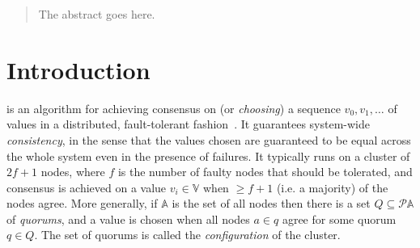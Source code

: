\documentclass[journal]{IEEEtran}
\begin{document}







\maketitle

\begin{abstract}
The abstract goes here. %
\end{abstract}







%
\IEEEpeerreviewmaketitle

\section{Introduction}

 is an algorithm for achieving consensus on (or
\textit{choosing}) a sequence $v_0, v_1, \ldots$ of values in a distributed,
fault-tolerant fashion~\cite{part-time-parliament}. It guarantees system-wide
\textit{consistency}, in the sense that the values chosen are guaranteed to be
equal across the whole system even in the presence of failures. It typically
runs on a cluster of $2f+1$ nodes, where $f$ is the number of faulty nodes that
should be tolerated, and consensus is achieved on a value $v_i \in \mathbb V$
when $\ge f+1$ (i.e.  a majority) of the nodes agree.  More generally, if
$\mathbb A$ is the set of all nodes then there is a set $Q \subseteq \mathcal P
\mathbb A$ of \textit{quorums}, and a value is chosen when all nodes $a \in q$
agree for some quorum $q \in Q$. The set of quorums is called the
\textit{configuration} of the cluster.
\end{document}
